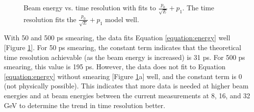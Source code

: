 \documentclass[twocolumn,aps,prd,reprint]{revtex4-1}
\begin{document}
\begin{figure}[!htbp]
\centering
{}
\hspace{3mm}
\hspace{3mm}
\caption{Beam energy vs. time resolution with fits to $\frac{p_0}{\sqrt{E}} + p_1$. The time resolution fits the $\frac{p_0}{\sqrt{E}} + p_1$ model well.}
\label{energy fits}
\end{figure}

With 50 and 500 ps smearing, the data fits Equation \ref{equation:energy} well [Figure \ref{energy fits}]. For 50 ps smearing, the constant term indicates that the theoretical time resolution achievable (as the beam energy is increased) is 31 ps. For 500 ps smearing, this value is 195 ps. However, the data does not fit to Equation \ref{equation:energy} without smearing [Figure \ref{energy fits}a] well, and the constant term is 0 (not physically possible). This indicates that more data is needed at higher beam energies and at beam energies between the current measurements at 8, 16, and 32 GeV to determine the trend in time resolution better.
\end{document}
